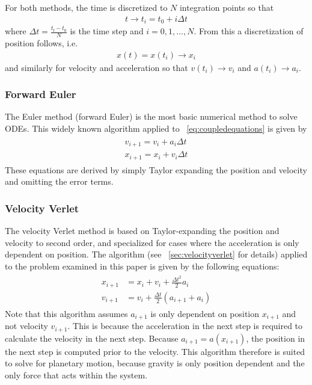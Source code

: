 \documentclass[aps,reprint]{revtex4-1}
\begin{document}
For both methods, the time is discretized to $N$ integration points so that
\begin{align*}
  t \rightarrow t_i = t_0 + i \Delta{t}
\end{align*}
where $\Delta{t} = \frac{t_\text{f} - t_0}{N}$ is the time step and $i = 0, 1, \hdots, N$.
From this a discretization of position follows, i.e.
\begin{align*}
  x(t) = x(t_i) \rightarrow x_i
\end{align*}
and similarly for velocity and acceleration so that $v(t_i) \rightarrow v_i$ and
$a(t_i) \rightarrow a_i$.

\subsubsection{Forward Euler}
The Euler method (forward Euler) is the most basic numerical method to solve
ODEs. This widely known algorithm applied to ~\ref{eq:coupledequations} is given by
\begin{align*}
  \begin{split}
  v_{i+1} = v_{i} + a_{i}\Delta{t} \\
  x_{i+1} = x_{i} + v_{i}\Delta{t}
\end{split}
\end{align*}
These equations are derived by simply Taylor expanding the position and velocity
and omitting the error terms.
\subsubsection{Velocity Verlet}
The velocity Verlet method is based on Taylor-expanding the position and velocity
to second order, and specialized for cases where the acceleration is only
dependent on position. The algorithm (see ~\ref{sec:velocityverlet} for details)
applied to the problem examined in this paper is given by the following equations:
\begin{align}
  \begin{split}
    x_{i+1} &= x_i + v_i + \frac{\Delta{t}^2}{2} a_i \\
    v_{i+1} &= v_i + \frac{\Delta{t}}{2}(a_{i+1} + a_{i})
  \end{split}
\end{align}
Note that this algorithm assumes $a_{i+1}$ is only dependent on position $x_{i+1}$
and not velocity $v_{i+1}$. This is because the acceleration in the next step
is required to calculate the velocity in the next step. Because $a_{i+1} = a(x_{i+1})$,
the position in the next step is computed prior to the velocity. This algorithm
therefore is suited to solve for planetary motion, because gravity is only
position dependent and the only force that acts within the system.
\end{document}

